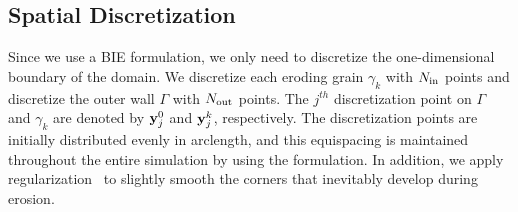 \documentclass{jfm}
\begin{document}
\subsection{Spatial Discretization}
\label{sec:spatialDiscretization}
Since we use a BIE formulation, we only need to discretize the
one-dimensional boundary of the domain.  We discretize each eroding
grain $\gamma_k$ with $N_{\mathrm{in}}$ points and discretize the outer wall
$\Gamma$ with $N_{\mathrm{out}}$ points.  The $j^{th}$ discretization point on
$\Gamma$ and $\gamma_k$ are denoted by ${\mathbf{y}}_j^0$ and ${\mathbf{y}}^k_j$,
respectively.  The discretization points are initially distributed
evenly in arclength, and this equispacing is maintained throughout the
entire simulation by using the {\thL} formulation.  In addition, we
apply regularization~\citep{qua-moo2018} to slightly smooth the corners
that inevitably develop during erosion.
\end{document}
